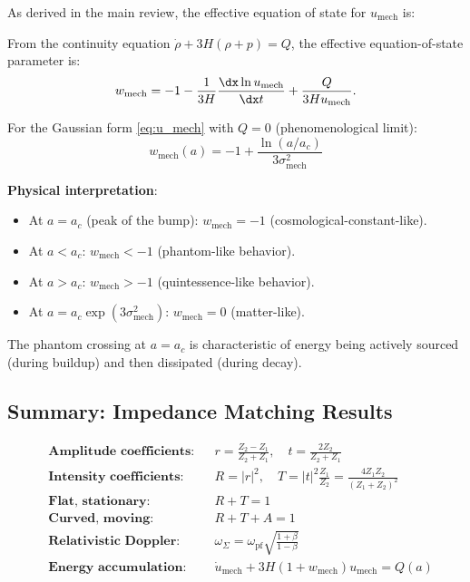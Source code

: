 As derived in the main review, the effective equation of state for $u_{\text{mech}}$ is:

\begin{proposition}
\label{prop:w_mech}
From the continuity equation $\dot{\rho} + 3H(\rho + p) = Q$, the effective equation-of-state parameter is:
\begin{equation}
\label{eq:w_mech_derivation}
w_{\text{mech}} = -1 - \frac{1}{3H} \frac{\dx \ln u_{\text{mech}}}{\dx t} + \frac{Q}{3H u_{\text{mech}}}.
\end{equation}

For the Gaussian form \eqref{eq:u_mech} with $Q = 0$ (phenomenological limit):
\begin{equation}
\label{eq:w_mech_Gaussian}
\boxed{w_{\text{mech}}(a) = -1 + \frac{\ln(a/a_c)}{3\sigma_{\text{mech}}^2}}
\end{equation}
\end{proposition}

\textbf{Physical interpretation}:
\begin{itemize}
    \item At $a = a_c$ (peak of the bump): $w_{\text{mech}} = -1$ (cosmological-constant-like).
    \item At $a < a_c$: $w_{\text{mech}} < -1$ (phantom-like behavior).
    \item At $a > a_c$: $w_{\text{mech}} > -1$ (quintessence-like behavior).
    \item At $a = a_c \exp(3\sigma_{\text{mech}}^2)$: $w_{\text{mech}} = 0$ (matter-like).
\end{itemize}

The phantom crossing at $a = a_c$ is characteristic of energy being actively sourced (during buildup) and then dissipated (during decay).

\subsection{Summary: Impedance Matching Results}
\label{app:impedance_summary}

\begin{equation}
\boxed{
\begin{aligned}
&\textbf{Amplitude coefficients:} && r = \frac{Z_2 - Z_1}{Z_2 + Z_1}, \quad t = \frac{2Z_2}{Z_2 + Z_1} \\[6pt]
&\textbf{Intensity coefficients:} && R = |r|^2, \quad T = |t|^2 \frac{Z_1}{Z_2} = \frac{4 Z_1 Z_2}{(Z_1 + Z_2)^2} \\[6pt]
&\textbf{Flat, stationary:} && R + T = 1 \\[6pt]
&\textbf{Curved, moving:} && R + T + A = 1 \\[6pt]
&\textbf{Relativistic Doppler:} && \omega_\Sigma = \omega_{\text{pf}} \sqrt{\frac{1+\beta}{1-\beta}} \\[6pt]
&\textbf{Energy accumulation:} && \dot{u}_{\text{mech}} + 3H(1 + w_{\text{mech}}) u_{\text{mech}} = Q(a)
\end{aligned}
}
\end{equation}

